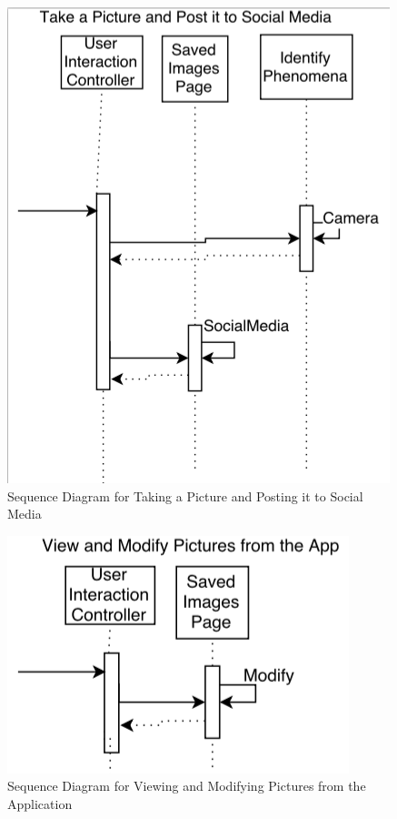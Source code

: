 \documentclass[]{article}
\begin{document}
\begin{figure}[!hb]
	\includegraphics[width=\linewidth]{sequenceDiagram2.png}
	\caption{Sequence Diagram for Taking a Picture and Posting it to Social Media}
\end{figure}
\begin{figure}[!hb]
	\includegraphics[width=\linewidth]{sequenceDiagram3.png}
	\caption{Sequence Diagram for Viewing and Modifying Pictures from the Application}
\end{figure}
\end{document}
